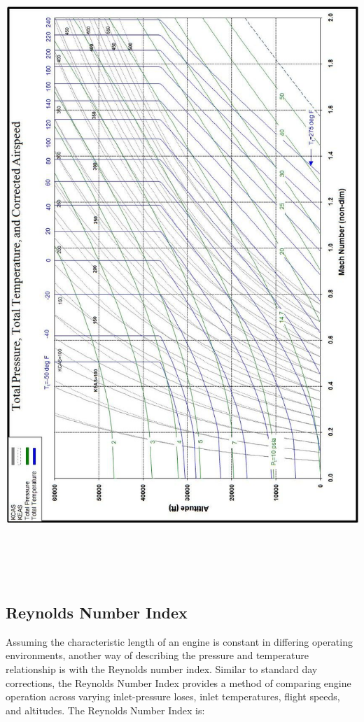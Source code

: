 \documentclass[
]{book}
\begin{document}
\includegraphics[width=6.79167in,height=9.33333in]{media/17/image12.jpg}

\hypertarget{reynolds-number-index}{%
\subsection{Reynolds Number Index}\label{reynolds-number-index}}

Assuming the characteristic length of an engine is constant in differing operating environments, another way of describing the pressure and temperature relationship is with the Reynolds number index. Similar to standard day corrections, the Reynolds Number Index provides a method of comparing engine operation across varying inlet-pressure loses, inlet temperatures, flight speeds, and altitudes. The Reynolds Number Index is:
\end{document}

